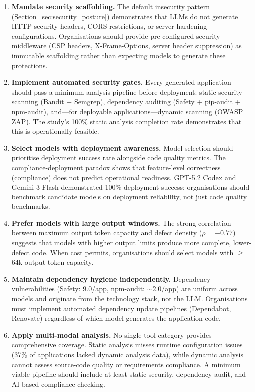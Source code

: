 \begin{enumerate}
    \item \textbf{Mandate security scaffolding.} The default insecurity pattern (Section~\ref{sec:security_posture}) demonstrates that LLMs do not generate HTTP security headers, CORS restrictions, or server hardening configurations. Organisations should provide pre-configured security middleware (CSP headers, X-Frame-Options, server header suppression) as immutable scaffolding rather than expecting models to generate these protections.

    \item \textbf{Implement automated security gates.} Every generated application should pass a minimum analysis pipeline before deployment: static security scanning (Bandit + Semgrep), dependency auditing (Safety + pip-audit + npm-audit), and---for deployable applications---dynamic scanning (OWASP ZAP). The study's 100\% static analysis completion rate demonstrates that this is operationally feasible.

    \item \textbf{Select models with deployment awareness.} Model selection should prioritise deployment success rate alongside code quality metrics. The compliance-deployment paradox shows that feature-level correctness (compliance) does not predict operational readiness. GPT-5.2 Codex and Gemini 3 Flash demonstrated 100\% deployment success; organisations should benchmark candidate models on deployment reliability, not just code quality benchmarks.

    \item \textbf{Prefer models with large output windows.} The strong correlation between maximum output token capacity and defect density ($\rho = -0.77$) suggests that models with higher output limits produce more complete, lower-defect code. When cost permits, organisations should select models with $\geq$64k output token capacity.

    \item \textbf{Maintain dependency hygiene independently.} Dependency vulnerabilities (Safety: 9.0/app, npm-audit: $\sim$2.0/app) are uniform across models and originate from the technology stack, not the LLM. Organisations must implement automated dependency update pipelines (Dependabot, Renovate) regardless of which model generates the application code.

    \item \textbf{Apply multi-modal analysis.} No single tool category provides comprehensive coverage. Static analysis misses runtime configuration issues (37\% of applications lacked dynamic analysis data), while dynamic analysis cannot assess source-code quality or requirements compliance. A minimum viable pipeline should include at least static security, dependency audit, and AI-based compliance checking.


\end{enumerate}
